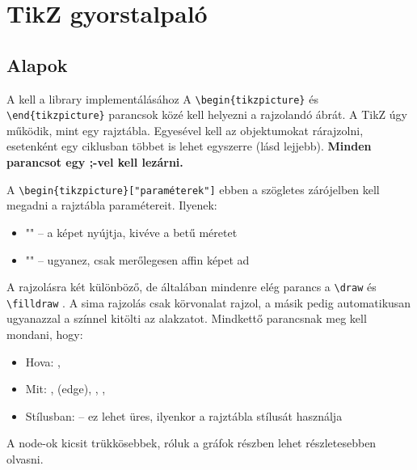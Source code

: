 \chapter{TikZ gyorstalpal\'o}

\section{Alapok}

A \code{\usepackage{tikzpicture}} kell a library implementálásához A \verb|\begin{tikzpicture}| és \verb|\end{tikzpicture}| parancsok közé kell helyezni a rajzolandó ábrát. A TikZ úgy működik, mint egy rajztábla. Egyesével kell az objektumokat rárajzolni, esetenként egy ciklusban többet is lehet egyszerre (lásd lejjebb). \textbf{Minden parancsot egy  ;-vel kell lezárni.}

A \verb|\begin{tikzpicture}["paraméterek"]| ebben a szögletes zárójelben kell megadni a rajztábla paramétereit. Ilyenek:
\begin{itemize}
    \item ""  -- a képet nyújtja, kivéve a betű méretet
    \item ""  -- ugyanez, csak merőlegesen affin képet ad
\end{itemize}

A rajzolásra két különböző, de általában mindenre elég parancs a \verb|\draw| és \verb|\filldraw| . A sima rajzolás csak körvonalat rajzol, a másik pedig automatikusan ugyanazzal a színnel kitölti az alakzatot. Mindkettő parancsnak meg kell mondani, hogy:

\begin{itemize}
    \item Hova: , 
    \item Mit: , \code{--} (edge), , , 
    \item Stílusban:  -- ez lehet üres, ilyenkor a rajztábla stílusát használja
\end{itemize}

A node-ok kicsit trükkösebbek, róluk a gráfok részben lehet részletesebben olvasni.

